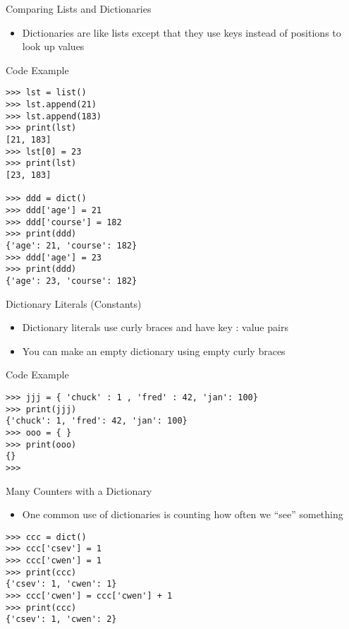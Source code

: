 \documentclass[serif, aspectratio=169]{beamer}
\begin{document}
\begin{frame}{Comparing Lists and Dictionaries}
    \begin{itemize}
        \item Dictionaries are like lists except that they use keys instead of positions to look up values
    \end{itemize}
\end{frame}

\begin{frame}[fragile]{Code Example}
    \begin{lstlisting}
>>> lst = list()
>>> lst.append(21)                 
>>> lst.append(183)
>>> print(lst)
[21, 183]
>>> lst[0] = 23
>>> print(lst)
[23, 183]

>>> ddd = dict()
>>> ddd['age'] = 21
>>> ddd['course'] = 182
>>> print(ddd)
{'age': 21, 'course': 182}
>>> ddd['age'] = 23
>>> print(ddd)
{'age': 23, 'course': 182}
    \end{lstlisting}
\end{frame}

\begin{frame}{Dictionary Literals (Constants)}
    \begin{itemize}
        \item Dictionary literals use curly braces and have key : value pairs
        \item You can make an empty dictionary using empty curly braces
    \end{itemize}
\end{frame}

\begin{frame}[fragile]{Code Example}
    \begin{lstlisting}
>>> jjj = { 'chuck' : 1 , 'fred' : 42, 'jan': 100}
>>> print(jjj)
{'chuck': 1, 'fred': 42, 'jan': 100}
>>> ooo = { }
>>> print(ooo)
{}
>>>
    \end{lstlisting}
\end{frame}

\begin{frame}[fragile]{Many Counters with a Dictionary}
\begin{itemize}
        \item One common use of dictionaries is counting how often we “see” something 
    \end{itemize}
    \begin{lstlisting}
>>> ccc = dict()
>>> ccc['csev'] = 1
>>> ccc['cwen'] = 1
>>> print(ccc)
{'csev': 1, 'cwen': 1}
>>> ccc['cwen'] = ccc['cwen'] + 1
>>> print(ccc)
{'csev': 1, 'cwen': 2}
    \end{lstlisting}
\end{frame}
\end{document}

